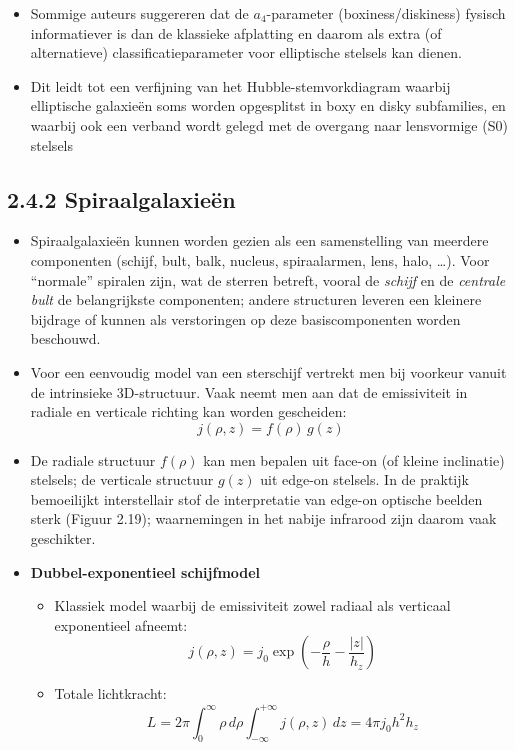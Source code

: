 \documentclass[10pt,a4paper]{article}
\renewenvironment{equation}{\begin{equation*}}{\end{equation*}}
\begin{document}
\begin{itemize}
\begin{itemize}
  \item Sommige auteurs suggereren dat de $a_4$-parameter (boxiness/diskiness) fysisch informatiever is dan de klassieke afplatting en daarom als extra (of alternatieve) classificatieparameter voor elliptische stelsels kan dienen.
  \item Dit leidt tot een verfijning van het Hubble-stemvorkdiagram waarbij elliptische galaxieën soms worden opgesplitst in boxy en disky subfamilies, en waarbij ook een verband wordt gelegd met de overgang naar lensvormige (S0) stelsels 
\end{itemize}
\end{itemize}
\subsection*{2.4.2 Spiraalgalaxieën}
\begin{itemize}
  \item Spiraalgalaxieën kunnen worden gezien als een samenstelling van meerdere componenten (schijf, bult, balk, nucleus, spiraalarmen, lens, halo, \dots). Voor ``normale'' spiralen zijn, wat de sterren betreft, vooral de \textit{schijf} en de \textit{centrale bult} de belangrijkste componenten; andere structuren leveren een kleinere bijdrage of kunnen als verstoringen op deze basiscomponenten worden beschouwd.

  \item Voor een eenvoudig model van een sterschijf vertrekt men bij voorkeur vanuit de intrinsieke 3D-structuur. Vaak neemt men aan dat de emissiviteit in radiale en verticale richting kan worden gescheiden:
  \begin{equation}
    j(\rho,z)=f(\rho)\,g(z)
    \tag{2.57}
  \end{equation}
  \item De radiale structuur $f(\rho)$ kan men bepalen uit face-on (of kleine inclinatie) stelsels; de verticale structuur $g(z)$ uit edge-on stelsels. In de praktijk bemoeilijkt interstellair stof de interpretatie van edge-on optische beelden sterk (Figuur 2.19); waarnemingen in het nabije infrarood zijn daarom vaak geschikter.

  \item \textbf{Dubbel-exponentieel schijfmodel}
  \begin{itemize}
    \item Klassiek model waarbij de emissiviteit zowel radiaal als verticaal exponentieel afneemt:
    \begin{equation}
      j(\rho,z)=j_0\exp\!\left(-\frac{\rho}{h}-\frac{|z|}{h_z}\right)
      \tag{2.58}
    \end{equation}
    \item Totale lichtkracht:
    \begin{equation}
      L = 2\pi\int_0^\infty \rho\,d\rho \int_{-\infty}^{+\infty} j(\rho,z)\,dz
      = 4\pi j_0 h^2 h_z
      \tag{2.59}
    \end{equation}
  \end{itemize}


\end{itemize}
\end{document}
